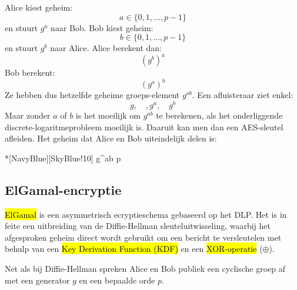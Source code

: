 
Alice kiest geheim:
\begin{equation*}
    a \in \{0, 1, \dots, p-1\}
\end{equation*}
en stuurt $g^a$ naar Bob. Bob kiest geheim:
\begin{equation*}
    b \in \{0, 1, \dots, p-1\}
\end{equation*}
en stuurt $g^b$ naar Alice.\newline
Alice berekent dan:
\begin{equation*}
    \left(g^b\right)^a
\end{equation*}
Bob berekent:
\begin{equation*}
    \left(g^a\right)^b
\end{equation*}
Ze hebben dus hetzelfde geheime groeps-element $g^{ab}$. Een afluisteraar ziet enkel:
\begin{equation*}
    g, \quad, g^a, \quad g^b
\end{equation*}
Maar zonder $a$ of $b$ is het moeilijk om $g^{ab}$ te berekenen, als het onderliggende discrete-logaritmeprobleem moeilijk is. Daaruit kan men dan een AES-sleutel afleiden.
Het geheim dat Alice en Bob uiteindelijk delen is:
\begin{equationbox}*[NavyBlue][SkyBlue!10]
    g^{ab} \pmod p
\end{equationbox}

\begin{center}
\resizebox{0.8\textwidth}{!}{%
    
}
\end{center}

\subsection{ElGamal-encryptie}\label{sec:l7_elgamal}

\hl{ElGamal} is een asymmetrisch ecryptieschema gebaseerd op het DLP. Het is in feite een uitbreiding van de Diffie-Hellman sleuteluitwisseling, waarbij het afgesproken geheim direct wordt gebruikt om een bericht te versleutelen met behulp van een \hl{Key Derivation Function (KDF)} en een \hl{XOR-operatie} ($\oplus$).


Net als bij Diffie-Hellman spreken Alice en Bob publiek een cyclische groep af met een generator $g$ en een bepaalde orde $p$.


